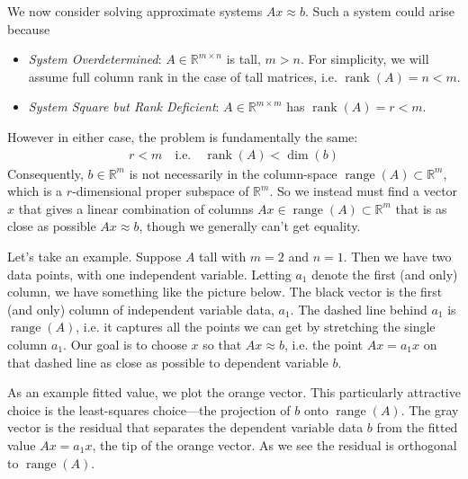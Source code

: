 \documentclass[12pt]{article}
\numberwithin{equation}{section} %
\theoremstyle{plain}
\theoremstyle{definition}
\theoremstyle{remark}
\newcommand{\Rm}{\mathbb{R}^m}
\newcommand{\Rmn}{\mathbb{R}^{m\times n}}
\newcommand{\Rmm}{\mathbb{R}^{m\times m}}
\newcommand{\range}{\operatorname{range}}
\newcommand{\rank}{\operatorname{rank}}
\begin{document}
We now consider solving approximate systems $Ax\approx b$.
Such a system could arise because
\begin{itemize}
  \item \emph{System Overdetermined}: $A\in\Rmn$ is tall, $m>n$.
    For simplicity, we will assume full column rank in the case of tall
    matrices, i.e.  $\rank(A)=n<m$.
  \item \emph{System Square but Rank Deficient}:
    $A\in\Rmm$ has $\rank(A)=r<m$.
\end{itemize}
However in either case, the problem is fundamentally the same:
\begin{align*}
  r < m
  \quad\text{i.e.}\quad
  \rank(A)<\dim(b)
\end{align*}
Consequently, $b\in\Rm$ is not necessarily in the column-space
$\range(A)\subset\Rm$, which is a $r$-dimensional proper subspace of
$\Rm$.  So we instead must find a vector $x$ that gives a linear
combination of columns $Ax\in\range(A)\subset\Rm$ that is as close as
possible $Ax\approx b$, though we generally can't get equality.

Let's take an example. Suppose $A$ tall with $m=2$ and $n=1$. Then we
have two data points, with one independent variable. Letting $a_1$
denote the first (and only) column, we have something like the picture
below.  The black vector is the first (and only) column of independent
variable data, $a_1$. The dashed line behind $a_1$ is $\range(A)$, i.e.
it captures all the points we can get by stretching the single column
$a_1$. Our goal is to choose $x$ so that $Ax\approx b$, i.e. the point
$Ax=a_1x$ on that dashed line as close as possible to dependent
variable $b$.

As an example fitted value, we plot the orange vector.
This particularly attractive choice is the least-squares choice---the
projection of $b$ onto $\range(A)$. The gray vector is the residual that
separates the dependent variable data $b$ from the fitted value
$Ax=a_1x$, the tip of the orange vector. As we see the
residual is orthogonal to $\range(A)$.
\end{document}
